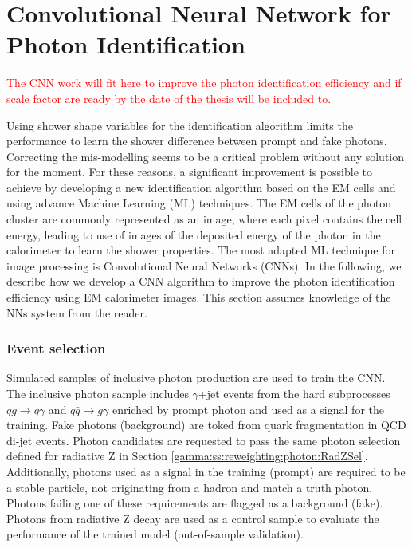 \section{Convolutional Neural Network for Photon Identification}
\label{gamma:CNN}
\textcolor{red}{The CNN work will fit here to improve the photon identification efficiency and if scale factor are ready by the date of the thesis will be included to. \\}

Using shower shape variables for the identification algorithm limits the performance to learn the shower difference between prompt and fake photons. Correcting the mis-modelling seems to be a critical problem without any solution for the moment. For these reasons, a significant improvement is possible to achieve by developing a new identification algorithm based on the EM cells and using advance Machine Learning (ML) techniques. The EM cells of the photon cluster are commonly represented as an image, where each pixel contains the cell energy, leading to use of images of the deposited energy of the photon in the calorimeter to learn the shower properties. The most adapted ML technique for image processing is Convolutional Neural Networks (CNNs). In the following, we describe how we develop a CNN algorithm to improve the photon identification efficiency using EM calorimeter images. This section assumes knowledge of the NNs system from the reader. 
\subsubsection{Event selection}
Simulated samples of inclusive photon production are used to train the CNN. The inclusive photon sample includes $\gamma$+jet events from the hard subprocesses $qg \rightarrow q\gamma$ and $ q\bar{q}\rightarrow g\gamma$ enriched by prompt photon and used as a signal for the training. Fake photons (background) are toked from quark fragmentation in QCD di-jet events. Photon candidates are requested to pass the same photon selection defined for radiative Z in Section \ref{gamma:ss:reweighting:photon:RadZSel}. Additionally, photons used as a signal in the training (prompt) are required to be a stable particle, not originating from a hadron and match a truth photon. Photons failing one of these requirements are flagged as a background (fake). Photons from radiative Z decay are used as a control sample to evaluate the performance of the trained model (out-of-sample validation).
